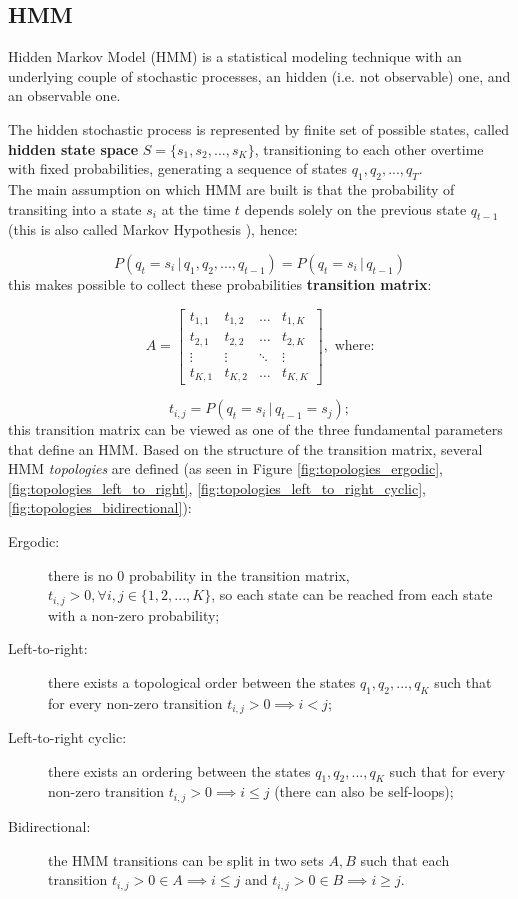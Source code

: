\subsection{HMM}

Hidden Markov Model (HMM) is a statistical modeling technique with an underlying couple of stochastic processes, an hidden (i.e. not observable) one, and an observable one. 

The hidden stochastic process is represented by finite set of possible states, called \textbf{hidden state space} $S = \{s_1, s_2, ..., s_K\}$, transitioning to each other overtime with fixed probabilities, generating a sequence of states $q_1, q_2, ..., q_T$. \\
The main assumption on which HMM are built is that the probability of transiting into a state $s_i$ at the time $t$ depends solely on the previous state $q_{t-1}$ (this is also called Markov Hypothesis \cite{markovbook}), hence:

$$P(q_t = s_i \, | \, q_1, q_2, ..., q_{t-1}) = P(q_t = s_i \, | \, q_{t-1})$$
this makes possible to collect these probabilities \textbf{transition matrix}:

$$
A = 
\begin{bmatrix}
    t_{1,1} & t_{1,2} & \dots  & t_{1, K} \\
    t_{2, 1} & t_{2, 2} & \dots  & t_{2, K} \\
    \vdots & \vdots & \ddots & \vdots \\
    t_{K, 1} & t_{K, 2} & \dots  & t_{K, K}
\end{bmatrix}, \text{ where:}
$$

$$t_{i, j} = P(q_t = s_i \, | \, q_{t-1} = s_j);$$
this transition matrix can be viewed as one of the three fundamental parameters that define an HMM. Based on the structure of the transition matrix, several HMM \textit{topologies} are defined (as seen in Figure \vref{fig:topologies_ergodic}, 
\vref{fig:topologies_left_to_right},
\vref{fig:topologies_left_to_right_cyclic},
\vref{fig:topologies_bidirectional}):

\begin{description}
    \item[Ergodic:] there is no 0 probability in the transition matrix, $t_{i, j} > 0, \forall i,j \in \{1,2, ..., K\}$, so each state can be reached from each state with a non-zero probability; 
    
    \item[Left-to-right:] there exists a topological order between the states $q_1, q_2, ..., q_K$ such that for every non-zero transition $t_{i, j} > 0 \implies i < j$; 
    
    \item[Left-to-right cyclic:] there exists an ordering between the states $q_1, q_2, ..., q_K$ such that for every non-zero transition $t_{i, j} > 0 \implies i \leq j$ (there can also be self-loops);
    
    \item[Bidirectional:] the HMM transitions can be split in two sets $A, B$ such that each transition $t_{i, j} > 0 \in A \implies i \leq j$ and $t_{i, j} > 0 \in B \implies i \geq j$.
\end{description}


